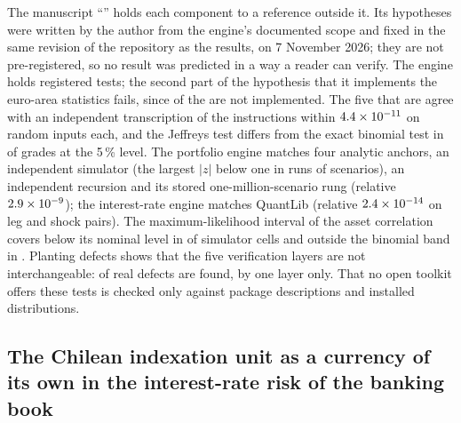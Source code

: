 The manuscript ``\pxPaperTitleSix{}'' holds each component to a reference outside it. Its hypotheses were written by the author from the engine's documented scope and fixed in the same revision of the
repository as the results, on 7 November 2026; they are not pre-registered, so no result was predicted in a way a reader can verify. The engine holds \pxPpSixTests{} registered tests; the second part of the
hypothesis that it implements the euro-area statistics fails, since \pxPpSixAbsent{} of the \pxPpSixSections{} are not implemented. The five that are agree with an independent transcription of the instructions within
$4.4\times 10^{-11}$ on \pxPpSixEcbInputs{} random inputs each, and the Jeffreys test differs from the exact binomial test in \pxPpSixDisagree{} of \pxPpSixCells{} grades at the 5\,\% level. The portfolio engine
matches four analytic anchors, an independent simulator (the largest $|z|$ below one in \pxPpSixMcReps{} runs of \pxPpSixMcScen{} scenarios), an independent recursion and its stored one-million-scenario rung (relative
$2.9\times 10^{-9}$); the interest-rate engine matches QuantLib (relative $2.4\times 10^{-14}$ on \pxPpSixLegs{} leg and shock pairs). The maximum-likelihood interval of the asset correlation covers below its
nominal level in \pxPpSixMlBelow{} of \pxPpSixMlCells{} simulator cells and outside the binomial band in \pxPpSixMlFail{}. Planting \pxPpSixMutants{} defects shows that the five verification layers are not
interchangeable: \pxPpSixAny{} of \pxPpSixReal{} real defects are found, \pxPpSixOnly{} by one layer only. That no open toolkit offers these tests is checked only against \pxPpSixPypi{} package descriptions and
\pxPpSixDist{} installed distributions.

\subsection{The Chilean indexation unit as a currency of its own in the interest-rate risk of the banking book}
\label{sec:bs7}

